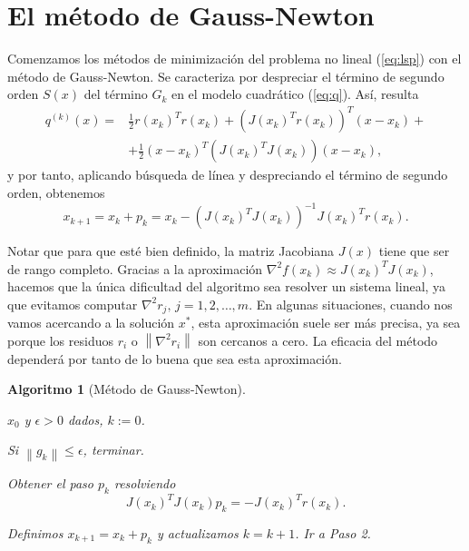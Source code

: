 \documentclass[11pt,a4paper]{book}
\newtheorem{algorithm}[theorem]{Algoritmo}
\theoremstyle{definition}
\theoremstyle{remark}
\newcommand{\norm}[1]{\left\lVert#1\right\rVert}
\begin{document}
\section{El método de Gauss-Newton}

Comenzamos los métodos de minimización del problema no lineal (\ref{eq:lsp}) con el método de Gauss-Newton. Se caracteriza por despreciar el término de segundo orden $S(x)$ del término $G_k$ en el modelo cuadrático (\ref{eq:q}). Así, resulta
\begin{equation}
\begin{split}
q^{(k)}(x) =& \frac{1}{2}r(x_k)^Tr(x_k)+(J(x_k)^Tr(x_k))^T(x-x_k)+ \\
	& +\frac{1}{2}(x-x_k)^T(J(x_k)^TJ(x_k))(x-x_k),
\end{split}
\end{equation}
y por tanto, aplicando búsqueda de línea y despreciando el término de segundo orden, obtenemos
\begin{equation}
	x_{k+1} = x_k + p_k = x_k -(J(x_k)^TJ(x_k))^{-1}J(x_k)^Tr(x_k).
\end{equation}

Notar que para que esté bien definido, la matriz Jacobiana $J(x)$ tiene que ser de rango completo. Gracias a la aproximación $\nabla^2 f(x_k) \approx J(x_k)^TJ(x_k)$, hacemos que la única dificultad del algoritmo sea resolver un sistema lineal, ya que evitamos computar $\nabla^2 r_j,\,j=1,2,\ldots ,m$. En algunas situaciones, cuando nos vamos acercando a la solución $x^*$, esta aproximación suele ser más precisa, ya sea porque los residuos $r_i$ o $\norm{\nabla^2 r_i}$ son cercanos a cero. La eficacia del método dependerá por tanto de lo buena que sea esta aproximación.

\begin{algorithm}[Método de Gauss-Newton] \leavevmode
\label{al:g-n}
\begin{steps}
	\item $x_0$ y $\epsilon > 0$ dados, $k:=0$.
	\item Si $\norm{g_k} \leq \epsilon$, terminar.
	\item Obtener el paso $p_k$ resolviendo
		\begin{equation}
			J(x_k)^TJ(x_k)p_k = -J(x_k)^Tr(x_k).
		\end{equation}
	\item Definimos $x_{k+1} = x_k + p_k$ y actualizamos $k=k+1$. Ir a Paso 2. \quad \qedsymbol
\end{steps}
\end{algorithm}
\end{document}
